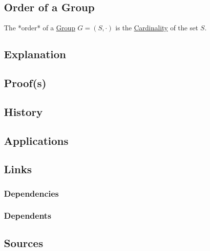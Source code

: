\subsection{Order of a Group}\label{articles:algebra:group-theory:order-of-a-group}
The *order* of a \hyperref[articles:algebra:group-theory:group]{Group} $G = (S, \cdot)$ is the \hyperref[articles:set-theory:cardinality]{Cardinality} of the set $S$.

\subsection{Explanation}

\subsection{Proof(s)}

\subsection{History}

\subsection{Applications}

\subsection{Links}
\subsubsection{Dependencies}
\subsubsection{Dependents}

\subsection{Sources}
